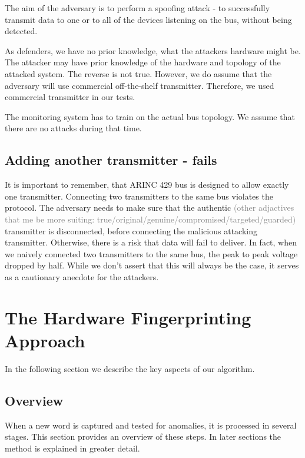\documentclass[conference]{IEEEtran}
\begin{document}
  The aim of the adversary is to perform a spoofing attack - to successfully transmit data to one or to all of the devices listening on the bus, without being detected. 

  As defenders, we have no prior knowledge, what the attackers hardware might be. The attacker may have prior knowledge of the hardware and topology of the attacked system. The reverse is not true. However, we do assume that the adversary will use commercial off-the-shelf transmitter. Therefore, we used commercial transmitter in our tests.

  The monitoring system has to train on the actual bus topology. We assume that there are no attacks during that time.

\subsection{Adding another transmitter - fails}
  It is important to remember, that ARINC 429 bus is designed to allow exactly one transmitter. Connecting two transmitters to the same bus violates the protocol. The adversary needs to make sure that the authentic \textcolor{gray}{(other adjactives that me be more suiting: true/original/genuine/compromised/targeted/guarded)} transmitter is disconnected, before connecting the malicious attacking transmitter. Otherwise, there is a risk that data will fail to deliver. In fact, when we naively connected two transmitters to the same bus, the peak to peak voltage dropped by half. While we don't assert that this will always be the case, it serves as a cautionary anecdote for the attackers.

\section{The Hardware Fingerprinting Approach}
  In the following section we describe the key aspects of our algorithm.

\subsection{Overview} \label{Overview}
  When a new word is captured and tested for anomalies, it is processed in several stages. This section provides an overview of these steps. In later sections the method is explained in greater detail.
  
\end{document}
